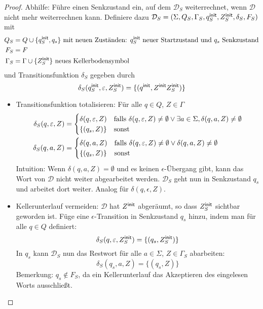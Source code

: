 {\begin{proof}
  Abhilfe: Führe einen Senkzustand ein, auf dem $\mathcal{D}_S$ weiterrechnet, wenn $\mathcal{D}$ nicht mehr weiterrechnen kann. 
  Definiere dazu $\mathcal{D}_S = (\Sigma, Q_S, \Gamma_S, q^\mathsf{init}_S, Z^\mathsf{init}_S, \delta_S, F_S)$ mit
  \begin{align*}
  Q_S &= Q \cup \{q^\mathsf{init}_S, q_s\} \text{ mit neuen Zuständen: $q^\mathsf{init}_S$ neuer Startzustand und $q_s$ Senkzustand} \\
  F_S &= F \\
  \Gamma_S &= \Gamma \cup \{Z^\mathsf{init}_S\} \text{ neues Kellerbodensymbol}
  \end{align*}
  und Transitionsfunktion $\delta_S$ gegeben durch
  \[\delta_S (q^\mathsf{init}_S, \varepsilon, Z^\mathsf{init}_S) = \{ (q^\mathsf{init}, Z^\mathsf{init}Z^\mathsf{init}_S) \} \]
  \begin{itemize}
  \item Transitionsfunktion totalisieren: Für alle $q\in Q$, $Z \in \Gamma$
    \begin{align*}
      \delta_S (q, \varepsilon, Z) &=
      \begin{cases}
        \delta (q, \varepsilon, Z) & \text{falls
        }\delta (q, \varepsilon, Z)\ne\emptyset\vee\exists a\in\Sigma, \delta (q, a, Z)\ne \emptyset \\
        \{ (q_s, Z) \} & \text{sonst}
      \end{cases} \\
      \delta_S (q, a, Z) &=
      \begin{cases}
        \delta (q, a, Z) & \text{falls }\delta (q, \varepsilon, Z)\ne\emptyset\vee\delta (q,
        a, Z) \ne \emptyset \\
        \{ (q_s, Z) \} & \text{sonst}
      \end{cases}
    \end{align*}
    Intuition: Wenn $\delta(q, a, Z) = \emptyset$ und es keinen $\epsilon$-Übergang gibt, kann das Wort von $\mathcal{D}$ nicht weiter abgearbeitet werden. $\mathcal{D}_S$ geht nun in Senkzustand $q_s$ und arbeitet dort weiter. Analog für $\delta(q, \epsilon, Z)$.
  \item Kellerunterlauf vermeiden: $\mathcal{D}$ hat $Z^\mathsf{init}$ abgeräumt, so dass $Z^\mathsf{init}_S$
    sichtbar geworden ist. Füge eine $\epsilon$-Transition in
     Senkzustand $q_s$ hinzu, indem man für alle $q\in Q$ definiert:
    \[\delta_S (q, \varepsilon, Z^\mathsf{init}_S) = \{ (q_s, Z^\mathsf{init}_S) \} \]
  In $q_s$ kann $\mathcal{D}_S$ nun das Restwort für alle $a\in\Sigma$, $Z\in \Gamma_S$ abarbeiten:
    \[\delta_S (q_s, a, Z) = \{ (q_s, Z) \}\]
    Bemerkung: $q_s \not \in F_S$, da ein Kellerunterlauf
    das Akzeptieren des eingelesen Worts ausschließt.
  \end{itemize}


\end{proof}}
